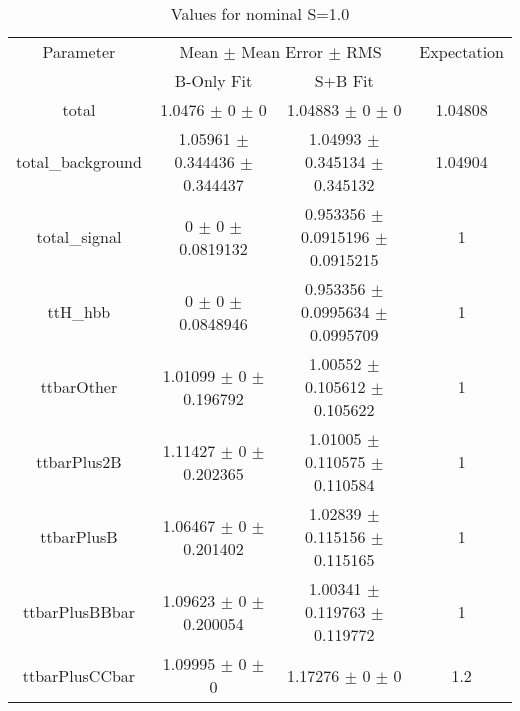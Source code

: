 \begin{table}
\centering
\caption{Values for nominal S=1.0}
\begin{tabular}{cccc}
\toprule
Parameter & \multicolumn{2}{c}{Mean $\pm$ Mean Error $\pm$ RMS} & Expectation\\
 & B-Only Fit & S+B Fit & \\
\midrule
total & \num{1.0476} $\pm$ \num{0} $\pm$ \num{0} & \num{1.04883} $\pm$ \num{0} $\pm$ \num{0} & \num{1.04808}\\
total\_background & \num{1.05961} $\pm$ \num{0.344436} $\pm$ \num{0.344437} & \num{1.04993} $\pm$ \num{0.345134} $\pm$ \num{0.345132} & \num{1.04904}\\
total\_signal & \num{0} $\pm$ \num{0} $\pm$ \num{0.0819132} & \num{0.953356} $\pm$ \num{0.0915196} $\pm$ \num{0.0915215} & \num{1}\\
ttH\_hbb & \num{0} $\pm$ \num{0} $\pm$ \num{0.0848946} & \num{0.953356} $\pm$ \num{0.0995634} $\pm$ \num{0.0995709} & \num{1}\\
ttbarOther & \num{1.01099} $\pm$ \num{0} $\pm$ \num{0.196792} & \num{1.00552} $\pm$ \num{0.105612} $\pm$ \num{0.105622} & \num{1}\\
ttbarPlus2B & \num{1.11427} $\pm$ \num{0} $\pm$ \num{0.202365} & \num{1.01005} $\pm$ \num{0.110575} $\pm$ \num{0.110584} & \num{1}\\
ttbarPlusB & \num{1.06467} $\pm$ \num{0} $\pm$ \num{0.201402} & \num{1.02839} $\pm$ \num{0.115156} $\pm$ \num{0.115165} & \num{1}\\
ttbarPlusBBbar & \num{1.09623} $\pm$ \num{0} $\pm$ \num{0.200054} & \num{1.00341} $\pm$ \num{0.119763} $\pm$ \num{0.119772} & \num{1}\\
ttbarPlusCCbar & \num{1.09995} $\pm$ \num{0} $\pm$ \num{0} & \num{1.17276} $\pm$ \num{0} $\pm$ \num{0} & \num{1.2}\\
\bottomrule
\end{tabular}
\end{table}